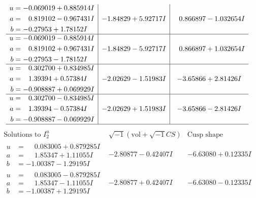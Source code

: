 \documentclass[1p]{elsarticle_modified}
\theoremstyle{definition}
\newcommand{\I}{\sqrt{-1}}
\begin{document}
$$\begin{array}{c|c|c}
\begin{aligned}
u &= -0.069019 + 0.885914 I \\
a &= \phantom{-}0.819102 - 0.967431 I \\
b &= -0.27953 + 1.78152 I\end{aligned}
 & -1.84829 + 5.92717 I & \phantom{-}0.866897 - 1.032654 I \\ \hline\begin{aligned}
u &= -0.069019 - 0.885914 I \\
a &= \phantom{-}0.819102 + 0.967431 I \\
b &= -0.27953 - 1.78152 I\end{aligned}
 & -1.84829 - 5.92717 I & \phantom{-}0.866897 + 1.032654 I \\ \hline\begin{aligned}
u &= \phantom{-}0.302700 + 0.834985 I \\
a &= \phantom{-}1.39394 + 0.57384 I \\
b &= -0.908887 + 0.069929 I\end{aligned}
 & -2.02629 - 1.51983 I & -3.65866 + 2.81426 I \\ \hline\begin{aligned}
u &= \phantom{-}0.302700 - 0.834985 I \\
a &= \phantom{-}1.39394 - 0.57384 I \\
b &= -0.908887 - 0.069929 I\end{aligned}
 & -2.02629 + 1.51983 I & -3.65866 - 2.81426 I\\
 \hline 
 \end{array}$$\newpage$$\begin{array}{c|c|c}  
\text{Solutions to }I^u_{2}& \I (\text{vol} + \sqrt{-1}CS) & \text{Cusp shape}\\
 \hline 
\begin{aligned}
u &= \phantom{-}0.083005 + 0.879285 I \\
a &= \phantom{-}1.85347 + 1.11055 I \\
b &= -1.00387 - 1.29195 I\end{aligned}
 & -2.80877 - 0.42407 I & -6.63080 + 0.12335 I \\ \hline\begin{aligned}
u &= \phantom{-}0.083005 - 0.879285 I \\
a &= \phantom{-}1.85347 - 1.11055 I \\
b &= -1.00387 + 1.29195 I\end{aligned}
 & -2.80877 + 0.42407 I & -6.63080 - 0.12335 I \\ \hline\begin{aligned}

\end{aligned}
\end{array}$$
\end{document}
